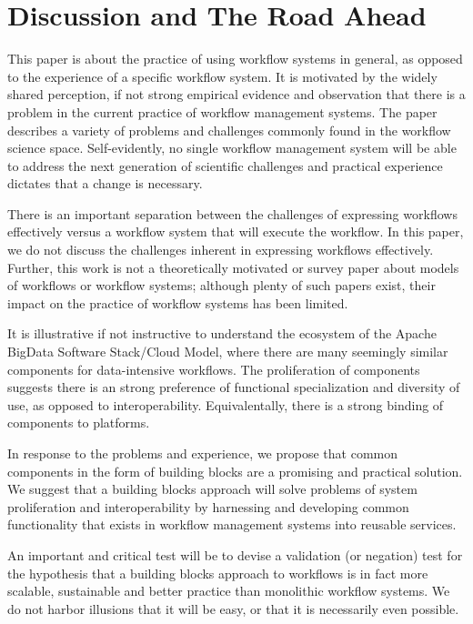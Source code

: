 \section{Discussion and The Road Ahead}\label{discussion}

This paper is about the practice of using workflow systems in general, as
opposed to the experience of a specific workflow system. It is motivated by
the widely shared perception, if not strong empirical evidence and observation
that there is a problem in the current practice of workflow management
systems. The paper describes a variety of problems and challenges commonly
found in the workflow science space. Self-evidently, no single workflow
management system will be able to address the next generation of scientific
challenges and practical experience dictates that a change is necessary.

There is an important separation between the challenges of expressing
workflows effectively versus a workflow system that will execute the workflow.
In this paper, we do not discuss the challenges inherent in expressing
workflows effectively. Further, this work is not a theoretically motivated or
survey paper about models of workflows or workflow systems; although plenty of
such papers exist, their impact on the practice of workflow systems has been
limited.

It is illustrative if not instructive to understand the ecosystem of the
Apache BigData Software Stack/Cloud Model, where there are many seemingly
similar components for  data-intensive workflows. The proliferation of
components suggests there is an strong preference of functional specialization
and diversity of use, as opposed to interoperability.  Equivalentally, there
is a strong binding of components to platforms.

In response to the problems and experience, we propose that common components
in the form of building blocks are a promising and practical solution. We
suggest that a building blocks approach will solve problems of system
proliferation and interoperability by harnessing and developing common
functionality that exists in workflow management systems into reusable
services.

An important and critical test will be to devise a validation (or negation)
test for the hypothesis that a building blocks approach to workflows is in fact
more scalable, sustainable and better practice than monolithic workflow
systems. We do not harbor illusions that it will be easy, or that it is
necessarily even possible.



